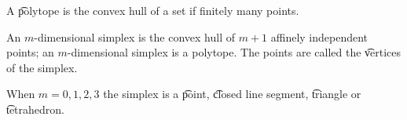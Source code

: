 


A \t{polytope} is the convex hull of a set if finitely many points.

An \t{$m$-dimensional simplex} is the convex hull of $m+1$ affinely independent points; an $m$-dimensional simplex is a polytope.
The points are called the \t{vertices} of the simplex.

When $m = 0, 1, 2, 3$ the simplex is a \t{point}, \t{closed line segment}, \t{triangle} or \t{tetrahedron}.
